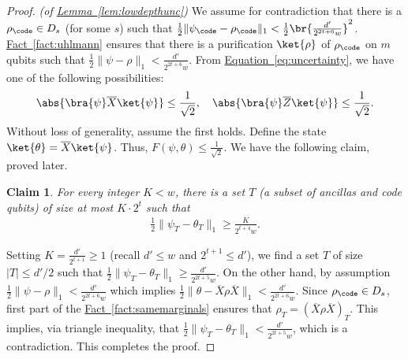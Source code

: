\documentclass[11pt]{article}
\newcommand{\expref}[2]{\texorpdfstring{\hyperref[#2]{#1~\ref{#2}}}{#1~\ref{#2}}}
\newcommand{\expeqref}[2]{\texorpdfstring{\hyperref[#2]{#1~\eqref{#2}}}{#1~\eqref{#2}}}
\newtheorem{claim}[theorem]{Claim}
\begin{document}
\begin{proof}\textit{(of \expref{Lemma}{lem:lowdepthunc})}
We assume for contradiction that there is a $\rho_{\code}\in D_{s}$ (for some $s$) such that $\frac{1}{2}\|\psi_{\code}-\rho_{\code}\|_1< \frac{1}{2}\br{\frac{d'}{2^{2t+6}w}}^2$. \expref{Fact}{fact:uhlmann} ensures that there is a purification $\ket{\rho}$ of $\rho_{\code}$ on $m$ qubits such that $\frac{1}{2}\|\psi-\rho\|_1< \frac{d'}{2^{2t+6}w}$.  From \expeqref{Equation}{eq:uncertainty}, we have one of the following possibilities:
\begin{align}\abs{\bra{\psi}\overline{X}\ket{\psi}}\leq \frac{1}{\sqrt{2}}, \quad \abs{\bra{\psi}\overline{Z}\ket{\psi}}\leq \frac{1}{\sqrt{2}}.\end{align}
Without loss of generality, assume the first holds.  Define the state $\ket{\theta}=\overline{X}\ket{\psi}$. Thus, $F(\psi, \theta)\leq \frac{1}{\sqrt{2}}$. We have the following claim, proved later.
\begin{claim}
\label{clm:localdistinguishable}
For every integer $K<w$, there is a set $T$ (a subset of ancillas and code qubits) of size at most $K\cdot 2^t$ such that 
\begin{align}\frac{1}{2}\|\psi_{T}- \theta_{T}\|_1 \geq \frac{K}{2^{t+4}w}.\end{align}
\end{claim}
Setting $K=\frac{d'}{2^{t+1}}\geq 1$ (recall $d'\leq w$ and $2^{t+1}\leq d'$), we find a set $T$ of size $|T|\leq d'/2$ such that $\frac{1}{2}\|\psi_{T}- \theta_{T}\|_1 \geq \frac{d'}{2^{2t+5}w}$. On the other hand, by assumption $\frac{1}{2}\|\psi-\rho\|_1< \frac{d'}{2^{2t+6}w}$ which implies $\frac{1}{2}\|\theta-\overline{X}\rho \overline{X}\|_1< \frac{d'}{2^{2t+6}w}$. Since $\rho_{\code} \in D_{s}$, first part of the \expref{Fact}{fact:samemarginals} ensures that $\rho_{T}=(\overline{X}\rho \overline{X})_{T}$. This implies, via triangle inequality, that $\frac{1}{2}\|\psi_{T}-\theta_{T}\|_1< \frac{d'}{2^{2t+5}w}$, which is a contradiction. This completes the proof.
\end{proof}
\end{document}
